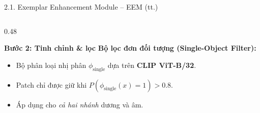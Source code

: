 \documentclass[11pt]{beamer}
\begin{document}
\begin{frame}[shrink=10]{2.1. Exemplar Enhancement Module -- EEM (tt.)}
\begin{columns}[T,onlytextwidth]
\begin{column}{0.48\textwidth}
\begin{block}{\textbf{Bước 2: Tinh chỉnh \& lọc}}
\vspace{0.3em}
\textbf{Bộ lọc đơn đối tượng (Single-Object Filter):}
\begin{itemize}
  \item Bộ phân loại nhị phân $\phi_{\text{single}}$ dựa trên \textbf{CLIP ViT-B/32}.
  \item Patch chỉ được giữ khi $P(\phi_{\text{single}}(x)=1) > 0.8$.
  \item Áp dụng cho \emph{cả hai nhánh} dương và âm.
\end{itemize}
\end{block}

\end{column}
\end{columns}

\end{frame}
\end{document}
